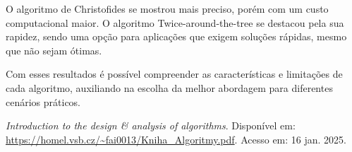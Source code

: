 \documentclass[12pt]{article}
\begin{document}
O algoritmo de Christofides se mostrou mais preciso, porém com um custo computacional maior. O algoritmo Twice-around-the-tree se destacou pela sua rapidez, sendo uma opção para aplicações que exigem soluções rápidas, mesmo que não sejam ótimas.

Com esses resultados é possível compreender as características e limitações de cada algoritmo, auxiliando na escolha da melhor abordagem para diferentes cenários práticos.

\begin{thebibliography}{1}

    \textit{Introduction to the design \& analysis of algorithms}. Disponível em: \url{https://homel.vsb.cz/~fai0013/Kniha_Algoritmy.pdf}. Acesso em: 16 jan. 2025.

\end{thebibliography}
\end{document}
